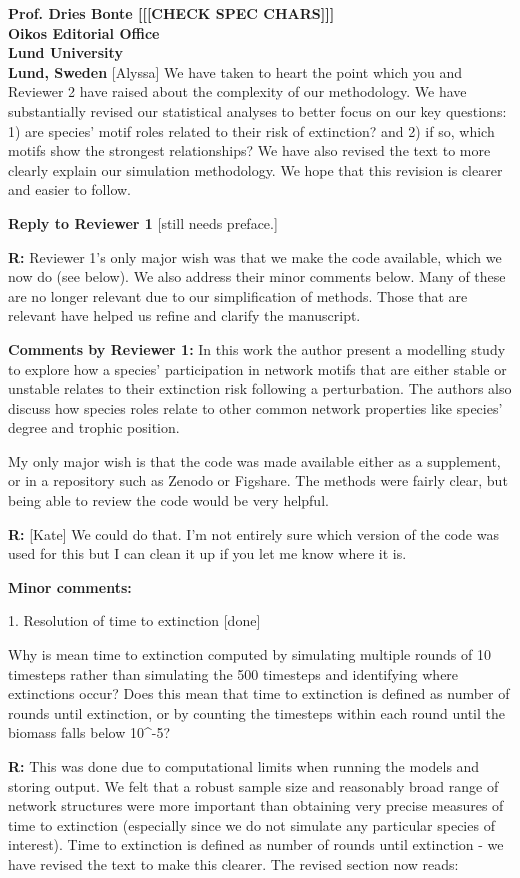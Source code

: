 \documentclass[12pt]{letter}
\begin{document}
\begin{letter}{\bf Prof. Dries Bonte [[[CHECK SPEC CHARS]]]\\
Oikos Editorial Office \\
Lund University \\
Lund, Sweden}
  [Alyssa]
  We have taken to heart the point which you and Reviewer 2 have raised about the complexity of our methodology. We have substantially revised our statistical analyses to better focus on our key questions: 1) are species' motif roles related to their risk of extinction? and 2) if so, which motifs show the strongest relationships? We have also revised the text to more clearly explain our simulation methodology. We hope that this revision is clearer and easier to follow.

\clearpage

\Large{\textbf{Reply to Reviewer 1}} [still needs preface.]

\textbf{R:} Reviewer 1's only major wish was that we make the code available, which we now do (see below). We also address their minor comments below. Many of these are no longer relevant due to our simplification of methods. Those that are relevant have helped us refine and clarify the manuscript.

\textbf{Comments by Reviewer 1:}
  In this work the author present a modelling study to explore how a species' participation in network motifs that are either stable or unstable relates to their extinction risk following a perturbation. The authors also discuss how species roles relate to other common network properties like species' degree and trophic position. 

  My only major wish is that the code was made available either as a supplement, or in a repository such as Zenodo or Figshare. The methods were fairly clear, but being able to review the code would be very helpful.


  \textbf{R:}  [Kate]
  We could do that. I'm not entirely sure which version of the code was used for this but I can clean it up if you let me know where it is.


  \textbf{Minor comments:}

  1. Resolution of time to extinction [done]


    Why is mean time to extinction computed by simulating multiple rounds of 10 timesteps rather than simulating the 500 timesteps and identifying where extinctions occur? Does this mean that time to extinction is defined as number of rounds until extinction, or by counting the timesteps within each round until the biomass falls below 10^-5? 

    \textbf{R:} This was done due to computational limits when running the models and storing output. We felt that a robust sample size and reasonably broad range of network structures were more important than obtaining very precise measures of time to extinction (especially since we do not simulate any particular species of interest). Time to extinction is defined as number of rounds until extinction - we have revised the text to make this clearer. The revised section now reads:


\end{letter}
\end{document}
